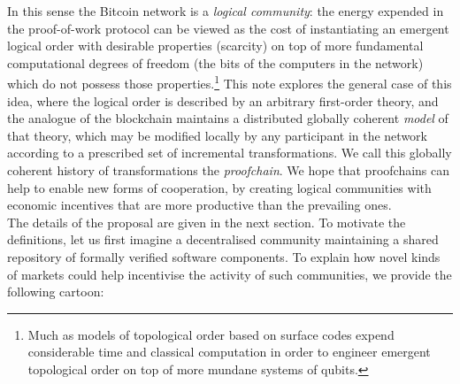 \documentclass[english,letter paper,12pt,reqno]{article}
\theoremstyle{example}
\begin{document}
In this sense the Bitcoin network is a \emph{logical community}: the energy expended in the proof-of-work protocol can be viewed as the cost of instantiating an emergent logical order with desirable properties (scarcity) on top of more fundamental computational degrees of freedom (the bits of the computers in the network) which do not possess those properties.\footnote{Much as models of topological order based on surface codes \cite{kitaev} expend considerable time and classical computation in order to engineer emergent topological order on top of more mundane systems of qubits.} This note explores the general case of this idea, where the logical order is described by an arbitrary first-order theory, and the analogue of the blockchain maintains a distributed globally coherent \emph{model} of that theory, which may be modified locally by any participant in the network according to a prescribed set of incremental transformations. We call this globally coherent history of transformations the \emph{proofchain}. We hope that proofchains can help to enable new forms of cooperation, by creating logical communities with economic incentives that are more productive than the prevailing ones. 
\\

The details of the proposal are given in the next section. To motivate the definitions, let us first imagine a decentralised community maintaining a shared repository of formally verified software components. To explain how novel kinds of markets could help incentivise the activity of such communities, we provide the following cartoon:
\end{document}
